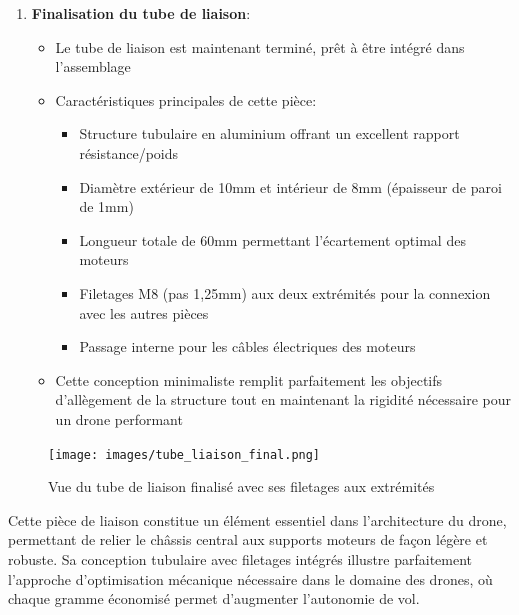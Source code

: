 \documentclass[a4paper,12pt]{report}
\begin{document}
\begin{enumerate}
    \item \textbf{Finalisation du tube de liaison}:
    \begin{itemize}
        \item Le tube de liaison est maintenant terminé, prêt à être intégré dans l'assemblage
        \item Caractéristiques principales de cette pièce:
        \begin{itemize}
            \item Structure tubulaire en aluminium offrant un excellent rapport résistance/poids
            \item Diamètre extérieur de 10mm et intérieur de 8mm (épaisseur de paroi de 1mm)
            \item Longueur totale de 60mm permettant l'écartement optimal des moteurs
            \item Filetages M8 (pas 1,25mm) aux deux extrémités pour la connexion avec les autres pièces
            \item Passage interne pour les câbles électriques des moteurs
        \end{itemize}
        \item Cette conception minimaliste remplit parfaitement les objectifs d'allègement de la structure tout en maintenant la rigidité nécessaire pour un drone performant
    \end{itemize}
\end{enumerate}

\begin{figure}[H]
    \centering
    \texttt{[image: images/tube\_liaison\_final.png]}
    \caption{Vue du tube de liaison finalisé avec ses filetages aux extrémités}
    \label{fig:tube_liaison_final}
\end{figure}

Cette pièce de liaison constitue un élément essentiel dans l'architecture du drone, permettant de relier le châssis central aux supports moteurs de façon légère et robuste. Sa conception tubulaire avec filetages intégrés illustre parfaitement l'approche d'optimisation mécanique nécessaire dans le domaine des drones, où chaque gramme économisé permet d'augmenter l'autonomie de vol.
\end{document}
